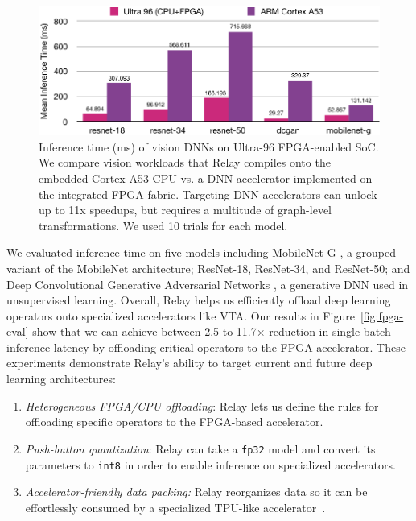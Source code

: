   \begin{figure}[h]
    \includegraphics[width=\textwidth]{fig_splash19/eval/vision_fpga.pdf}
    \caption{
      Inference time (ms) of vision DNNs on Ultra-96 FPGA-enabled SoC.
      We compare vision workloads that Relay compiles onto the embedded Cortex
        A53 CPU vs. a DNN accelerator implemented on the integrated FPGA fabric.
      Targeting DNN accelerators can unlock up to 11x speedups, but requires a
        multitude of graph-level transformations.
      We used 10 trials for each model.
    }
  \end{figure}

  We evaluated inference time on five models including MobileNet-G \citep{mobilenet}, a grouped variant of the MobileNet architecture; ResNet-18, ResNet-34, and ResNet-50\citep{resnet}; and Deep Convolutional Generative Adversarial Networks \citep{dcgan}, a generative DNN used in unsupervised learning.
  Overall, Relay helps us efficiently offload deep learning operators onto specialized accelerators like VTA.
  Our results in Figure~\ref{fig:fpga-eval} show that we can achieve between 2.5 to 11.7$\times$ reduction in single-batch inference latency by offloading critical operators to the FPGA accelerator.
  These experiments demonstrate Relay's ability to target current and future deep learning architectures:
  \begin{enumerate}
    \item \textit{Heterogeneous FPGA/CPU offloading}: Relay lets us define the rules for offloading specific operators to the FPGA-based accelerator.
    \item \textit{Push-button quantization}: Relay can take a \texttt{fp32} model and convert its parameters to \texttt{int8} in order to enable inference on specialized accelerators.
    \item \textit{Accelerator-friendly data packing:} Relay reorganizes data so it can be effortlessly consumed by a specialized TPU-like accelerator~\citep{tpuv1}.
  \end{enumerate}

